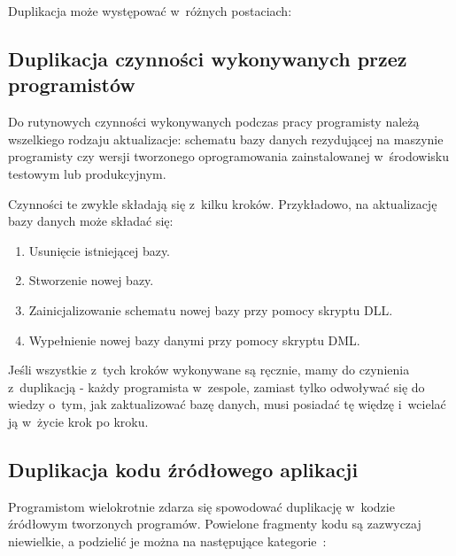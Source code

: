 Duplikacja może występować w~różnych postaciach:


\subsection{Duplikacja czynności wykonywanych przez programistów} \label{sec:tasks_dupl}

Do rutynowych czynności wykonywanych podczas pracy programisty należą wszelkiego rodzaju aktualizacje: schematu bazy danych rezydującej na maszynie programisty czy wersji tworzonego oprogramowania zainstalowanej w~środowisku testowym lub produkcyjnym.

Czynności te zwykle składają się z~kilku kroków. Przykładowo, na aktualizację bazy danych może składać się:

\begin{enumerate}
 \item Usunięcie istniejącej bazy.
 \item Stworzenie nowej bazy.
 \item Zainicjalizowanie schematu nowej bazy przy pomocy skryptu DLL.
 \item Wypełnienie nowej bazy danymi przy pomocy skryptu DML.
\end{enumerate}

Jeśli wszystkie z~tych kroków wykonywane są ręcznie, mamy do czynienia z~duplikacją - każdy programista w~zespole, zamiast tylko odwoływać się do wiedzy o~tym, jak zaktualizować bazę danych, musi posiadać tę więdzę i~wcielać ją w~życie krok po kroku.


\subsection{Duplikacja kodu źródłowego aplikacji} \label{sec:code_dupl_kinds}

Programistom wielokrotnie zdarza się spowodować duplikację w~kodzie źródłowym tworzonych programów.
Powielone fragmenty kodu są zazwyczaj niewielkie, a podzielić je można na następujące kategorie~\cite{soft_sol_dupl}:

